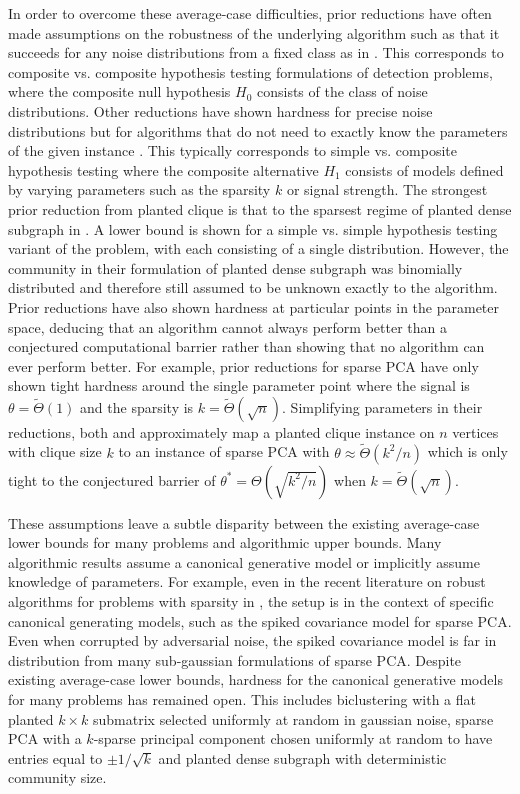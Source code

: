 In order to overcome these average-case difficulties, prior reductions have often made assumptions on the robustness of the underlying algorithm such as that it succeeds for any noise distributions from a fixed class as in \cite{berthet2013complexity, wang2016statistical, cai2015computational}. This corresponds to composite vs. composite hypothesis testing formulations of detection problems, where the composite null hypothesis $H_0$ consists of the class of noise distributions. Other reductions have shown hardness for precise noise distributions but for algorithms that do not need to exactly know the parameters of the given instance \cite{ma2015computational, gao2017sparse}. This typically corresponds to simple vs. composite hypothesis testing where the composite alternative $H_1$ consists of models defined by varying parameters such as the sparsity $k$ or signal strength. The strongest prior reduction from planted clique is that to the sparsest regime of planted dense subgraph in \cite{hajek2015computational}. A lower bound is shown for a simple vs. simple hypothesis testing variant of the problem, with each consisting of a single distribution. However, the community in their formulation of planted dense subgraph was binomially distributed and therefore still assumed to be unknown exactly to the algorithm. Prior reductions have also shown hardness at particular points in the parameter space, deducing that an algorithm cannot always perform better than a conjectured computational barrier rather than showing that no algorithm can ever perform better. For example, prior reductions for sparse PCA have only shown tight hardness around the single parameter point where the signal is $\theta = \tilde{\Theta}(1)$ and the sparsity is $k = \tilde{\Theta}(\sqrt{n})$. Simplifying parameters in their reductions, both \cite{berthet2013complexity} and \cite{gao2017sparse} approximately map a planted clique instance on $n$ vertices with clique size $k$ to an instance of sparse PCA with $\theta \approx \tilde{\Theta}(k^2/n)$ which is only tight to the conjectured barrier of $\theta^* = \Theta(\sqrt{k^2/n})$ when $k = \tilde{\Theta}(\sqrt{n})$.

These assumptions leave a subtle disparity between the existing average-case lower bounds for many problems and algorithmic upper bounds. Many algorithmic results assume a canonical generative model or implicitly assume knowledge of parameters. For example, even in the recent literature on robust algorithms for problems with sparsity in \cite{balakrishnan2017computationally, li2017robust}, the setup is in the context of specific canonical generating models, such as the spiked covariance model for sparse PCA. Even when corrupted by adversarial noise, the spiked covariance model is far in distribution from many sub-gaussian formulations of sparse PCA. Despite existing average-case lower bounds, hardness for the canonical generative models for many problems has remained open. This includes biclustering with a flat planted $k \times k$ submatrix selected uniformly at random in gaussian noise, sparse PCA with a $k$-sparse principal component chosen uniformly at random to have entries equal to $\pm 1/\sqrt{k}$ and planted dense subgraph with deterministic community size.

